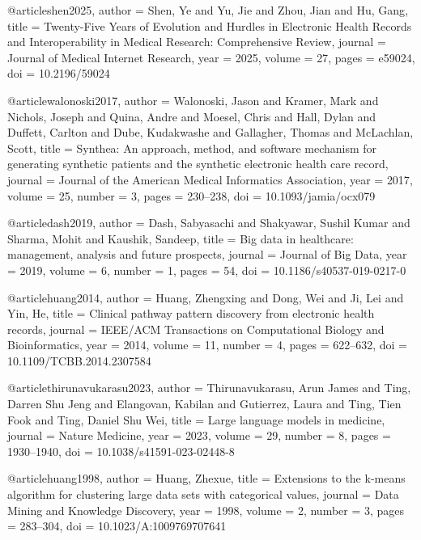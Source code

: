 @article{shen2025,
  author  = {Shen, Ye and Yu, Jie and Zhou, Jian and Hu, Gang},
  title   = {Twenty-Five Years of Evolution and Hurdles in Electronic
             Health Records and Interoperability in Medical Research:
             Comprehensive Review},
  journal = {Journal of Medical Internet Research},
  year    = {2025},
  volume  = {27},
  pages   = {e59024},
  doi     = {10.2196/59024}
}

@article{walonoski2017,
  author  = {Walonoski, Jason and Kramer, Mark and Nichols, Joseph and
             Quina, Andre and Moesel, Chris and Hall, Dylan and
             Duffett, Carlton and Dube, Kudakwashe and Gallagher, Thomas
             and McLachlan, Scott},
  title   = {Synthea: An approach, method, and software mechanism for
             generating synthetic patients and the synthetic electronic
             health care record},
  journal = {Journal of the American Medical Informatics Association},
  year    = {2017},
  volume  = {25},
  number  = {3},
  pages   = {230--238},
  doi     = {10.1093/jamia/ocx079}
}

@article{dash2019,
  author  = {Dash, Sabyasachi and Shakyawar, Sushil Kumar and
             Sharma, Mohit and Kaushik, Sandeep},
  title   = {Big data in healthcare: management, analysis and
             future prospects},
  journal = {Journal of Big Data},
  year    = {2019},
  volume  = {6},
  number  = {1},
  pages   = {54},
  doi     = {10.1186/s40537-019-0217-0}
}

@article{huang2014,
  author  = {Huang, Zhengxing and Dong, Wei and Ji, Lei and Yin, He},
  title   = {Clinical pathway pattern discovery from electronic
             health records},
  journal = {IEEE/ACM Transactions on Computational Biology
             and Bioinformatics},
  year    = {2014},
  volume  = {11},
  number  = {4},
  pages   = {622--632},
  doi     = {10.1109/TCBB.2014.2307584}
}

@article{thirunavukarasu2023,
  author  = {Thirunavukarasu, Arun James and Ting, Darren Shu Jeng and
             Elangovan, Kabilan and Gutierrez, Laura and
             Ting, Tien Fook and Ting, Daniel Shu Wei},
  title   = {Large language models in medicine},
  journal = {Nature Medicine},
  year    = {2023},
  volume  = {29},
  number  = {8},
  pages   = {1930--1940},
  doi     = {10.1038/s41591-023-02448-8}
}

@article{huang1998,
  author  = {Huang, Zhexue},
  title   = {Extensions to the k-means algorithm for clustering large
             data sets with categorical values},
  journal = {Data Mining and Knowledge Discovery},
  year    = {1998},
  volume  = {2},
  number  = {3},
  pages   = {283--304},
  doi     = {10.1023/A:1009769707641}
}

